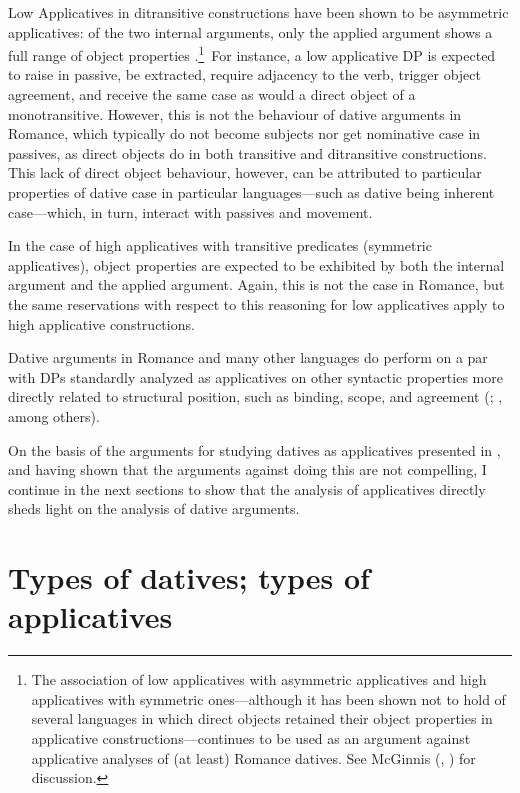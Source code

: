 \documentclass[output=paper,colorlinks,citecolor=brown,nonflat]{./langscibook}
\begin{document}
Low Applicatives in ditransitive constructions have been shown to be asymmetric applicatives:  of the two internal arguments, only the applied argument shows a full range of object properties \citep[203]{Pylkkänen2000}.\footnote{The association of low applicatives with asymmetric applicatives and high applicatives with symmetric ones—although it has been shown not to hold of several languages in which direct objects retained their object properties in applicative constructions—continues to be used as an argument against applicative analyses of (at least) Romance datives. See McGinnis (\citeyear{McGinnis2004}, \citeyear{McGinnis2008}) for discussion.}~For instance, a low applicative DP is expected to raise in passive, be extracted, require adjacency to the verb, trigger object agreement, and receive the same case as would a direct object of a monotransitive. However, this is not the behaviour of dative arguments in Romance, which typically do not become subjects nor get nominative case in passives, as direct objects do in both transitive and ditransitive constructions. This lack of direct object behaviour, however, can be attributed to particular properties of dative case in particular languages—such as dative being inherent case—which, in turn, interact with passives and movement.  

In the case of high applicatives with transitive predicates (symmetric applicatives), object properties are expected to be exhibited by both the internal argument and the applied argument. Again, this is not the case in Romance, but the same reservations with respect to this reasoning for low applicatives apply to high applicative constructions. 

Dative arguments in Romance and many other languages do perform on a par with DPs standardly analyzed as applicatives on other syntactic properties more directly related to structural position, such as  binding, scope, and agreement (; \citealt{BonehNash2017, Bruening2010Ditrans, Cuervo2003, Demonte1995, Pineda2016}, among others). 

On the basis of the arguments for studying datives as applicatives presented in , and having shown that the arguments against doing this are not compelling, I continue in the next sections to show that the analysis of applicatives directly sheds light on the analysis of dative arguments.

\section{Types of datives; types of applicatives}\label{sec:cuervo:3}
\end{document}
